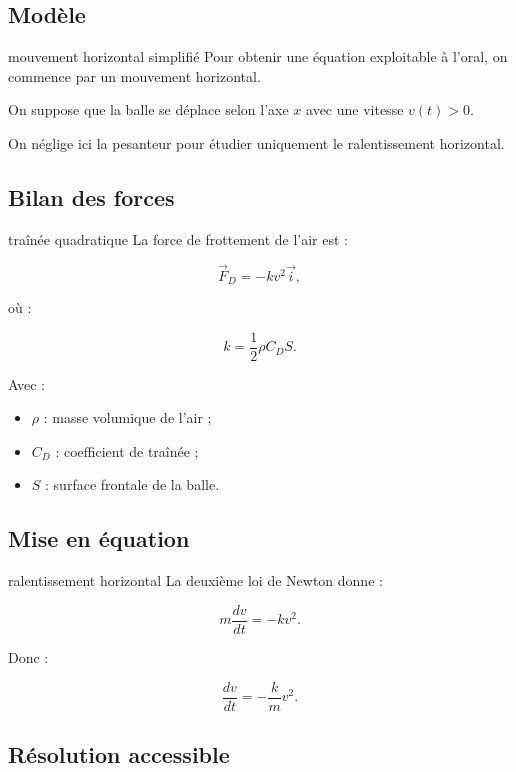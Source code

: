 \documentclass[11pt,a4paper]{article}
\begin{document}
\subsection{Modèle}

\begin{modele}{mouvement horizontal simplifié}
Pour obtenir une équation exploitable à l'oral, on commence par un mouvement horizontal.

On suppose que la balle se déplace selon l'axe $x$ avec une vitesse $v(t)>0$.

On néglige ici la pesanteur pour étudier uniquement le ralentissement horizontal.
\end{modele}

\subsection{Bilan des forces}

\begin{bilan}{traînée quadratique}
La force de frottement de l'air est :

\[
\vec{F}_D=-kv^2\vec{i},
\]

où :

\[
k=\frac12\rho C_D S.
\]

Avec :
\begin{itemize}
    \item $\rho$ : masse volumique de l'air ;
    \item $C_D$ : coefficient de traînée ;
    \item $S$ : surface frontale de la balle.
\end{itemize}
\end{bilan}

\subsection{Mise en équation}

\begin{equationbox}{ralentissement horizontal}
La deuxième loi de Newton donne :

\[
m\frac{dv}{dt}=-kv^2.
\]

Donc :

\[
\frac{dv}{dt}=-\frac{k}{m}v^2.
\]
\end{equationbox}

\subsection{Résolution accessible}
\end{document}
